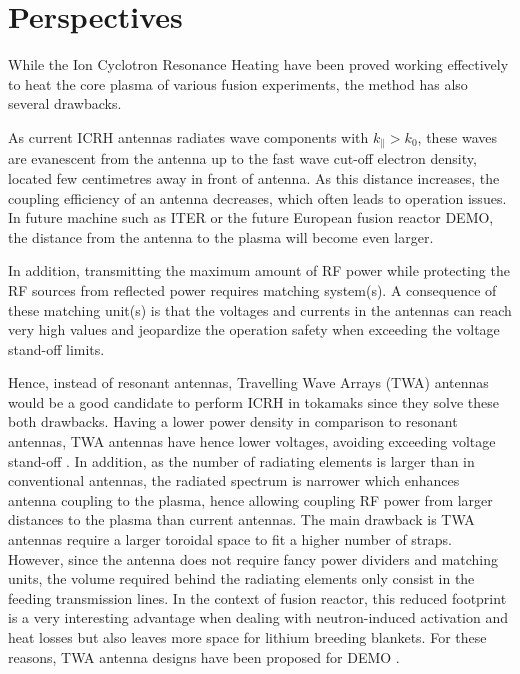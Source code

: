 {\section{Perspectives}
While the Ion Cyclotron Resonance Heating have been proved working effectively to heat the core plasma of various fusion  experiments, the method has also several drawbacks. 

As current ICRH antennas radiates  wave  components with $k_\parallel > k_0$, these waves are evanescent from the antenna up to the fast wave cut-off electron density, located few centimetres away in front of antenna. As this distance increases, the coupling efficiency of an antenna decreases, which often leads to operation issues. In future machine such as ITER or the future European fusion reactor DEMO, the distance from the antenna to the plasma will become even larger.

In addition, transmitting the maximum amount of RF power while protecting the RF sources from reflected power requires matching system(s). A consequence of these matching unit(s) is that the voltages and currents in the antennas can reach very high values and jeopardize the operation safety when exceeding the voltage stand-off limits.

Hence, instead of resonant antennas, Travelling Wave Arrays (TWA) antennas would be a good candidate to perform ICRH in tokamaks since they solve these both drawbacks. Having a lower power density in comparison to resonant antennas, TWA antennas have hence lower voltages, avoiding exceeding voltage stand-off . In addition, as the number of radiating elements is larger than in conventional antennas, the radiated spectrum is narrower which enhances antenna coupling to the plasma, hence allowing coupling RF power from larger distances to the plasma than current antennas. The main drawback is TWA antennas require a larger toroidal space to fit a higher number of straps. However, since the antenna does not require fancy power dividers and matching units, the volume required behind the radiating elements only consist in the feeding transmission lines. In the context of fusion reactor, this reduced footprint is a very interesting advantage when dealing with neutron-induced activation and heat losses but also leaves more space for lithium breeding blankets. For these reasons, TWA antenna designs have been proposed for DEMO . 

}
